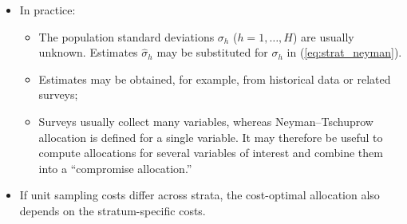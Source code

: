 \documentclass{my_eth_beamer}
\numberwithin{equation}{section}
\begin{document}
\begin{frame}
    \begin{itemize}
    \setlength{\itemsep}{12pt}
        \item In practice:
            \vspace{0.5em}
            \begin{itemize}
            \setlength{\itemsep}{12pt}
                \item The \alert{population standard deviations} $\sigma_h$
                    ($h=1, \ldots, H$) are usually unknown. Estimates
                    $\widehat{\sigma}_h$ may be substituted for $\sigma_h$ in
                    (\ref{eq:strat_neyman}).
                \item \alert{Estimates} may be obtained, for example, from
                    \alert{historical data} or \alert{related surveys};
                \item Surveys usually collect many variables, whereas
                    Neyman--Tschuprow allocation is defined for a single
                    variable. It may therefore be useful to compute allocations
                    for several variables of interest and combine them into a
                    \alert{``compromise allocation.''}
            \end{itemize}
        \item If unit sampling costs differ across strata, the
            \alert{cost-optimal allocation} also depends on the
            stratum-specific costs.
    \end{itemize}
\end{frame}
\end{document}

